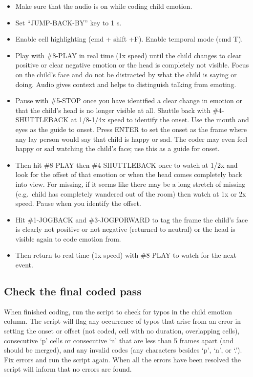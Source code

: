 \documentclass[
  12pt,
]{book}
\providecommand{\tightlist}{%
  \setlength{\itemsep}{0pt}\setlength{\parskip}{0pt}}
\begin{document}
\begin{itemize}
\tightlist
\item
  Make sure that the audio is on while coding child emotion.
\item
  Set ``JUMP-BACK-BY'' key to 1 s.
\item
  Enable cell highlighting (cmd + shift +F). Enable temporal mode (cmd T).
\item
  Play with \#8-PLAY in real time (1x speed) until the child changes to clear positive or clear negative emotion or the head is completely not visible. Focus on the child's face and do not be distracted by what the child is saying or doing. Audio gives context and helps to distinguish talking from emoting.
\item
  Pause with \#5-STOP once you have identified a clear change in emotion or that the child's head is no longer visible at all. Shuttle back with \#4-SHUTTLEBACK at 1/8-1/4x speed to identify the onset. Use the mouth and eyes as the guide to onset. Press ENTER to set the onset as the frame where any lay person would say that child is happy or sad. The coder may even feel happy or sad watching the child's face; use this as a guide for onset.
\item
  Then hit \#8-PLAY then \#4-SHUTTLEBACK once to watch at 1/2x and look for the offset of that emotion or when the head comes completely back into view. For missing, if it seems like there may be a long stretch of missing (e.g.~child has completely wandered out of the room) then watch at 1x or 2x speed. Pause when you identify the offset.
\item
  Hit \#1-JOGBACK and \#3-JOGFORWARD to tag the frame the child's face is clearly not positive or not negative (returned to neutral) or the head is visible again to code emotion from.
\item
  Then return to real time (1x speed) with \#8-PLAY to watch for the next event.
\end{itemize}

\hypertarget{check-the-final-coded-pass}{%
\subsection*{Check the final coded pass}\label{check-the-final-coded-pass}}

When finished coding, run the script to check for typos in the child emotion column. The script will flag any occurrence of typos that arise from an error in setting the onset or offset (not coded, cell with no duration, overlapping cells), consecutive `p' cells or consecutive `n' that are less than 5 frames apart (and should be merged), and any invalid codes (any characters besides `p', `n', or `.'). Fix errors and run the script again. When all the errors have been resolved the script will inform that no errors are found.
\end{document}
